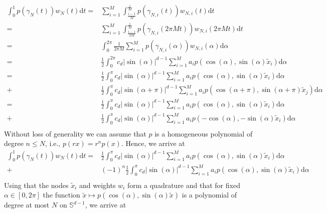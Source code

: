 \documentclass[%
a4paper,11pt,DIV=11,%
abstract=on%
]{scrartcl}
\begin{document}
\[
  \begin{aligned}
    \int_{0}^{1} p(\gamma_{N}(t)) w_{N}(t) \mathrm d t
    =&  \sum_{i=1}^{M} \int_{\frac{i-1}{M}}^{\frac i M} p(\gamma_{N,i}(t)) w_{N,i}(t) \mathrm dt \\
    =&  \sum_{i=1}^{M} \int_{\frac{i-1}{2M}}^{\frac i M} p(\gamma_{N,i}(2 \pi M t)) w_{N,i}(2\pi M t) \mathrm dt \\
    =&   \int_{0}^{2\pi}  \frac{1}{2\pi M} \sum_{i=1}^{M}  p(\gamma_{N,i}(\alpha)) w_{N,i}(\alpha) \mathrm d \alpha\\
    =  & \frac12\int_{0}^{2\pi}  c_{d} |\sin(\alpha)|^{d-1} \sum_{i=1}^{M} a_{i}  p(\cos(\alpha),\sin(\alpha)\tilde x_{i}) \mathrm d \alpha \\
    =  & \frac12\int_{0}^{\pi}  c_{d} |\sin(\alpha)|^{d-1} \sum_{i=1}^{M} a_{i}  p(\cos(\alpha),\sin(\alpha)\tilde x_{i}) \mathrm d \alpha \\
    +  & \frac12\int_{0}^{\pi}  c_{d} |\sin(\alpha+\pi)|^{d-1} \sum_{i=1}^{M} a_{i}  p(\cos(\alpha+\pi),\sin(\alpha+\pi)\tilde x_{j}) \mathrm d \alpha \\
    =  & \frac12\int_{0}^{\pi}  c_{d} |\sin(\alpha)|^{d-1} \sum_{i=1}^{M} a_{i}  p(\cos(\alpha),\sin(\alpha)\tilde x_{i}) \mathrm d \alpha \\
    +  & \frac12\int_{0}^{\pi}  c_{d} |\sin(\alpha)|^{d-1} \sum_{i=1}^{M} a_{i}  p(-\cos(\alpha),-\sin(\alpha)\tilde x_{i}) \mathrm d \alpha \\
  \end{aligned}
\]
Without loss of generality we can assume that $p$ is a homogeneous polynomial of degree $n \le N$, i.e., $p(r x) =r^{n} p(x).$ Hence, we arrive at
\[
  \begin{aligned}
    \int_{0}^{1} p(\gamma_{N}(t)) w_{N}(t) \mathrm d t
   =  & \frac12\int_{0}^{\pi}  c_{d} |\sin(\alpha)|^{d-1} \sum_{i=1}^{M} a_{i}  p(\cos(\alpha),\sin(\alpha)\tilde x_{i}) \mathrm d \alpha \\
    + & (-1)^{n} \frac12\int_{0}^{\pi}  c_{d} |\sin(\alpha)|^{d-1} \sum_{i=1}^{M} a_{i}  p(\cos(\alpha),\sin(\alpha)\tilde x_{i}) \mathrm d \alpha \\
  \end{aligned} 
\]
Using that the nodes $\tilde x_{i}$ and weights $w_i$ form a quadrature and that for fixed $\alpha \in [0,2\pi]$ the function $\tilde x \mapsto p(\cos(\alpha), \sin(\alpha) \tilde x)$ is a polynomial of degree at most $N$ on $\mathbb S^{d-1}$, we arrive at
\end{document}
